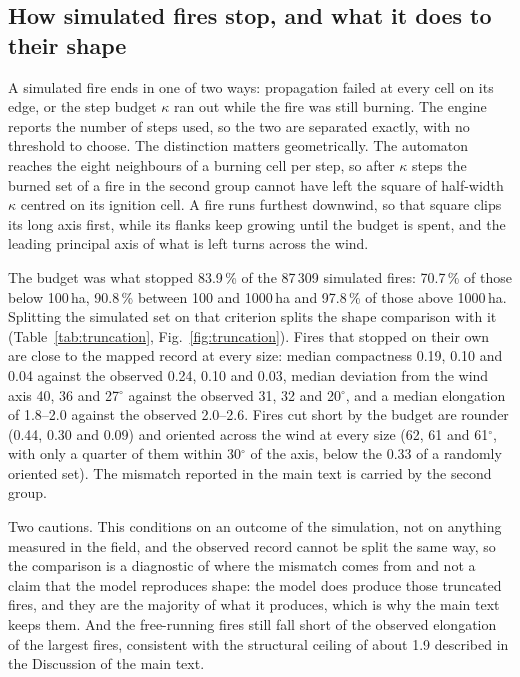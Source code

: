 \documentclass[11pt,a4paper]{article}
\begin{document}
\subsection{How simulated fires stop, and what it does to their shape}
\label{sec:truncation}

A simulated fire ends in one of two ways: propagation failed at every cell on its edge, or
the step budget $\kappa$ ran out while the fire was still burning. The engine reports the
number of steps used, so the two are separated exactly, with no threshold to choose. The
distinction matters geometrically. The automaton reaches the eight neighbours of a burning
cell per step, so after $\kappa$ steps the burned set of a fire in the second group cannot
have left the square of half-width $\kappa$ centred on its ignition cell. A fire runs
furthest downwind, so that square clips its long axis first, while its flanks keep growing
until the budget is spent, and the leading principal axis of what is left turns across the
wind.

The budget was what stopped 83.9\,\% of the 87\,309 simulated fires: 70.7\,\% of those below
100\,ha, 90.8\,\% between 100 and 1000\,ha and 97.8\,\% of those above 1000\,ha. Splitting
the simulated set on that criterion splits the shape comparison with it
(Table~\ref{tab:truncation}, Fig.~\ref{fig:truncation}). Fires that stopped on their own are
close to the mapped record at every size: median compactness 0.19, 0.10 and 0.04 against the
observed 0.24, 0.10 and 0.03, median deviation from the wind axis 40, 36 and 27$^\circ$
against the observed 31, 32 and 20$^\circ$, and a median elongation of 1.8--2.0 against the
observed 2.0--2.6. Fires cut short by the budget are rounder (0.44, 0.30 and 0.09) and
oriented across the wind at every size (62, 61 and 61$^\circ$, with only a quarter of them
within 30$^\circ$ of the axis, below the 0.33 of a randomly oriented set). The mismatch
reported in the main text is carried by the second group.

Two cautions. This conditions on an outcome of the simulation, not on anything measured in
the field, and the observed record cannot be split the same way, so the comparison is a
diagnostic of where the mismatch comes from and not a claim that the model reproduces shape:
the model does produce those truncated fires, and they are the majority of what it produces,
which is why the main text keeps them. And the free-running fires still fall short of the
observed elongation of the largest fires, consistent with the structural ceiling of about 1.9
described in the Discussion of the main text.
\end{document}
